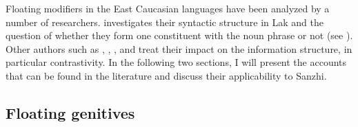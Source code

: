 Floating modifiers in the East Caucasian languages have been analyzed by a number of researchers. \citet{Kazenin2009} investigates their syntactic structure in Lak and the question of whether they form one constituent with the noun phrase or not (see ). Other authors such as \citet{Testelec1998a}, \citet{Creissels2013}, \citet{Komen2014}, and \citet{Lander2014, Lander2016} treat their impact on the information structure, in particular contrastivity. In the following two sections, I will present the accounts that can be found in the literature and discuss their applicability to Sanzhi.









\subsection{Floating genitives}
\label{ssec:Extraposed genitives}

